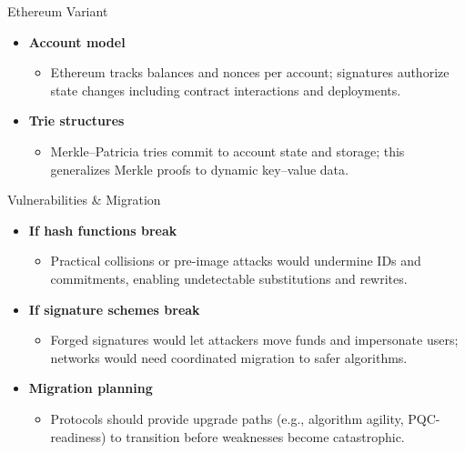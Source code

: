 \documentclass[aspectratio=169]{beamer}
\begin{document}
\begin{frame}{Ethereum Variant}
  \begin{itemize}
    \item \textbf{Account model}
      \begin{itemize}
        \item Ethereum tracks balances and nonces per account; signatures authorize state changes including contract interactions and deployments.
      \end{itemize}
    \item \textbf{Trie structures}
      \begin{itemize}
        \item Merkle–Patricia tries commit to account state and storage; this generalizes Merkle proofs to dynamic key–value data.
      \end{itemize}
  \end{itemize}
\end{frame}

\begin{frame}{Vulnerabilities \& Migration}
  \begin{itemize}
    \item \textbf{If hash functions break}
      \begin{itemize}
        \item Practical collisions or pre-image attacks would undermine IDs and commitments, enabling undetectable substitutions and rewrites.
      \end{itemize}
    \item \textbf{If signature schemes break}
      \begin{itemize}
        \item Forged signatures would let attackers move funds and impersonate users; networks would need coordinated migration to safer algorithms.
      \end{itemize}
    \item \textbf{Migration planning}
      \begin{itemize}
        \item Protocols should provide upgrade paths (e.g., algorithm agility, PQC-readiness) to transition before weaknesses become catastrophic.
      \end{itemize}
  \end{itemize}
\end{frame}
\end{document}
